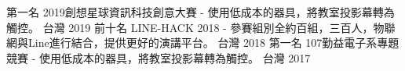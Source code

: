 



\begin{cvhonors}

  \cvhonor
    {第一名} %
    {2019創想星球資訊科技創意大賽 - 使用低成本的器具，將教室投影幕轉為觸控。} %
    {台灣} %
    {2019} %
  \cvhonor
    {前十名} %
    {LINE-HACK 2018 - 參賽組別全約百組，三百人，物聯網與Line進行結合，提供更好的演講平台。} %
    {台灣} %
    {2018} %
  \cvhonor
    {第一名} %
    {107勤益電子系專題競賽 - 使用低成本的器具，將教室投影幕轉為觸控。} %
    {台灣} %
    {2017} %
\end{cvhonors}
